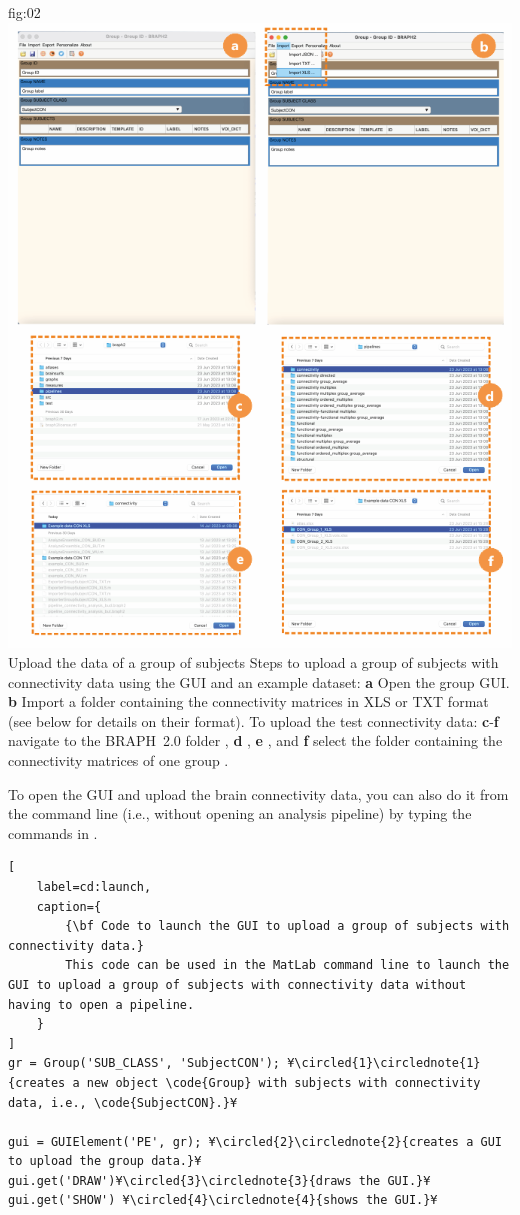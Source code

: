 \documentclass[justified]{tufte-handout}
\begin{document}
	{fig:02}
	{
	\includegraphics{fig02.png}
	}
	{Upload the data of a group of subjects}
	{
	Steps to upload a group of subjects with connectivity data using the GUI and an example dataset: 
	{\bf a} Open the group GUI.
	{\bf b} Import a folder containing the connectivity matrices in XLS or TXT format (see below for details on their format).
	To upload the test connectivity data:
	{\bf c}-{\bf f} navigate to the BRAPH~2.0 folder , {\bf d} ,  {\bf e} , and {\bf f} select the folder containing the connectivity matrices of one group .
	}

To open the GUI and upload the brain connectivity data, you can also do it from the command line (i.e., without opening an analysis pipeline) by typing the commands in .
%
\begin{lstlisting}[
	label=cd:launch,
	caption={
		{\bf Code to launch the GUI to upload a group of subjects with connectivity data.}
		This code can be used in the MatLab command line to launch the GUI to upload a group of subjects with connectivity data without having to open a pipeline.
	}
]
gr = Group('SUB_CLASS', 'SubjectCON'); ¥\circled{1}\circlednote{1}{creates a new object \code{Group} with subjects with connectivity data, i.e., \code{SubjectCON}.}¥

gui = GUIElement('PE', gr); ¥\circled{2}\circlednote{2}{creates a GUI to upload the group data.}¥
gui.get('DRAW')¥\circled{3}\circlednote{3}{draws the GUI.}¥
gui.get('SHOW') ¥\circled{4}\circlednote{4}{shows the GUI.}¥
\end{lstlisting}
\end{document}
